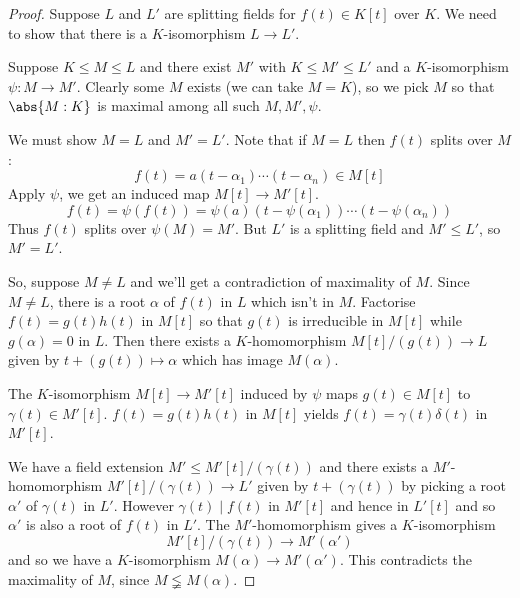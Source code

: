 \documentclass{article}
\begin{document}
\begin{proof}
    Suppose $L$ and $L'$ are splitting fields for $f(t) \in K[t]$ over $K$. We need to show that there is a $K$-isomorphism $L \to L'$.

    Suppose $K \leq M \leq L$ and there exist $M'$ with $K \leq M' \leq L'$ and a $K$-isomorphism $\psi: M \to M'$.
    Clearly some $M$ exists (we can take $M=K$), so we pick $M$ so that $\abs{M:K}$ is maximal among all such $M, M', \psi$.

    We must show $M=L$ and $M' = L'$. Note that if $M = L$ then $f(t)$ splits over $M$:
    \begin{equation*}
        f(t) = a(t - \alpha_1) \dotsm (t - \alpha_n) \in M[t]
    \end{equation*}
    Apply $\psi$, we get an induced map $M[t] \to M'[t]$.
    \begin{equation*}
        f(t) = \psi(f(t)) = \psi(a) (t - \psi(\alpha_1)) \dotsm (t - \psi(\alpha_n))
    \end{equation*}
    Thus $f(t)$ splits over $\psi(M) = M'$. But $L'$ is a splitting field and $M' \leq L'$, so $M'=L'$.

    So, suppose $M\neq L$ and we'll get a contradiction of maximality of $M$.
    Since $M \neq L$, there is a root $\alpha$ of $f(t)$ in $L$ which isn't in $M$.
    Factorise $f(t) = g(t) h(t)$ in $M[t]$ so that $g(t)$ is irreducible in $M[t]$ while $g(\alpha) = 0$ in $L$.
    Then there exists a $K$-homomorphism $M[t]/(g(t)) \to L$ given by $t + (g(t)) \mapsto \alpha$ which has image $M(\alpha)$.

    The $K$-isomorphism $M[t] \to M'[t]$ induced by $\psi$ maps $g(t) \in M[t]$ to $\gamma(t) \in M'[t]$.
    $f(t) = g(t) h(t)$ in $M[t]$ yields $f(t) = \gamma(t) \delta(t)$ in $M'[t]$.

    We have a field extension $M' \leq M'[t]/(\gamma(t))$ and there exists a $M'$-homomorphism $M'[t]/(\gamma(t)) \to L'$ given by $t + (\gamma(t))$ by picking a root $\alpha'$ of $\gamma(t)$ in $L'$.
    However $\gamma(t) \mid f(t)$ in $M'[t]$ and hence in $L'[t]$ and so $\alpha'$ is also a root of $f(t)$ in $L'$.
    The $M'$-homomorphism gives a $K$-isomorphism
    \begin{equation*}
        M'[t] / (\gamma(t)) \to M'(\alpha')
    \end{equation*}
    and so we have a $K$-isomorphism $M(\alpha) \to M'(\alpha')$. This contradicts the maximality of $M$, since $M \lneqq M(\alpha)$.
\end{proof}
\end{document}
